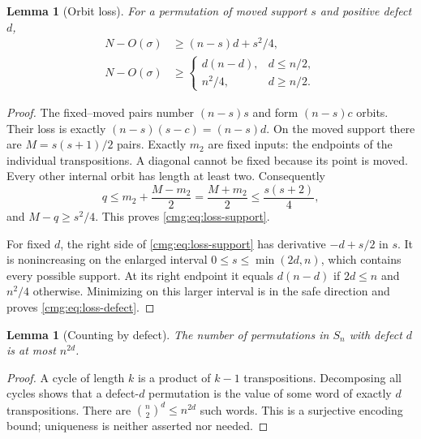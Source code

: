 \documentclass[11pt,letterpaper]{article}
\numberwithin{equation}{section}
\newtheorem{lemma}[theorem]{Lemma}
\theoremstyle{definition}\newtheorem{definition}[theorem]{Definition}
\theoremstyle{remark}\newtheorem{remark}[theorem]{Remark}
\begin{document}
\begin{lemma}[Orbit loss]\label{cmg:lem:loss}
For a permutation of moved support $s$ and positive defect $d$,
\begin{align}
 N-O(\sigma)&\ge(n-s)d+s^2/4,\label{cmg:eq:loss-support}\\
 N-O(\sigma)&\ge
 \begin{cases}d(n-d),&d\le n/2,\\ n^2/4,&d\ge n/2.\end{cases}\label{cmg:eq:loss-defect}
\end{align}
\end{lemma}
\begin{proof}
The fixed--moved pairs number $(n-s)s$ and form $(n-s)c$ orbits. Their loss is exactly $(n-s)(s-c)=(n-s)d$. On the moved support there are $M=s(s+1)/2$ pairs. Exactly $m_2$ are fixed inputs: the endpoints of the individual transpositions. A diagonal cannot be fixed because its point is moved. Every other internal orbit has length at least two. Consequently
\[
 q\le m_2+\frac{M-m_2}{2}=\frac{M+m_2}{2}
 \le\frac{s(s+2)}4,
\]
and $M-q\ge s^2/4$. This proves \eqref{cmg:eq:loss-support}.

For fixed $d$, the right side of \eqref{cmg:eq:loss-support} has derivative $-d+s/2$ in $s$. It is nonincreasing on the enlarged interval $0\le s\le\min(2d,n)$, which contains every possible support. At its right endpoint it equals $d(n-d)$ if $2d\le n$ and $n^2/4$ otherwise. Minimizing on this larger interval is in the safe direction and proves \eqref{cmg:eq:loss-defect}.
\end{proof}

\begin{lemma}[Counting by defect]\label{cmg:lem:defect-count}
The number of permutations in $S_n$ with defect $d$ is at most $n^{2d}$.
\end{lemma}
\begin{proof}
A cycle of length $k$ is a product of $k-1$ transpositions. Decomposing all cycles shows that a defect-$d$ permutation is the value of some word of exactly $d$ transpositions. There are $\binom n2^d\le n^{2d}$ such words. This is a surjective encoding bound; uniqueness is neither asserted nor needed.
\end{proof}
\end{document}
